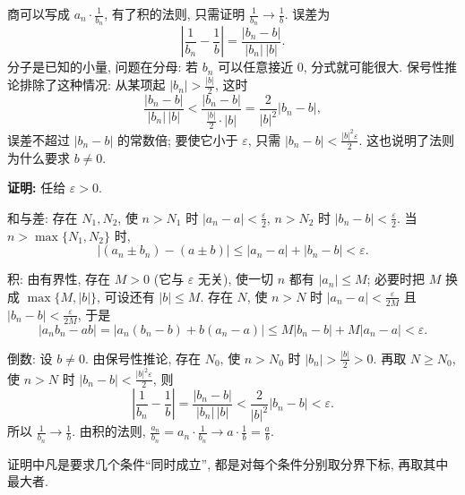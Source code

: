 \documentclass[UTF8,openany]{ctexbook}
\theoremstyle{chinesetextbook}
\newenvironment{cnproof}{\par\indent\textbf{证明:} \ignorespaces}{\par}
\begin{document}
商可以写成 $\displaystyle a_n\cdot\frac1{b_n}$, 有了积的法则, 只需证明 $\displaystyle\frac1{b_n}\to\frac1b$. 误差为
\[
\left|\frac1{b_n}-\frac1b\right|=\frac{|b_n-b|}{|b_n|\,|b|}.
\]
分子是已知的小量, 问题在分母: 若 $b_n$ 可以任意接近 $0$, 分式就可能很大. 保号性推论排除了这种情况: 从某项起 $\displaystyle|b_n|>\frac{|b|}2$, 这时
\[
\frac{|b_n-b|}{|b_n|\,|b|}<\frac{|b_n-b|}{\frac{|b|}2\cdot|b|}=\frac2{|b|^2}|b_n-b|,
\]
误差不超过 $|b_n-b|$ 的常数倍; 要使它小于 $\varepsilon$, 只需 $\displaystyle|b_n-b|<\frac{|b|^2\varepsilon}2$. 这也说明了法则为什么要求 $b\ne0$.
\begin{cnproof}
任给 $\varepsilon>0$.

和与差: 存在 $N_1,N_2$, 使 $n>N_1$ 时 $\displaystyle|a_n-a|<\frac\varepsilon2$, $n>N_2$ 时 $\displaystyle|b_n-b|<\frac\varepsilon2$. 当 $n>\max\{N_1,N_2\}$ 时,
\[
|(a_n\pm b_n)-(a\pm b)|\le|a_n-a|+|b_n-b|<\varepsilon.
\]

积: 由有界性, 存在 $M>0$ (它与 $\varepsilon$ 无关), 使一切 $n$ 都有 $|a_n|\le M$; 必要时把 $M$ 换成 $\max\{M,|b|\}$, 可设还有 $|b|\le M$. 存在 $N$, 使 $n>N$ 时 $\displaystyle|a_n-a|<\frac\varepsilon{2M}$ 且 $\displaystyle|b_n-b|<\frac\varepsilon{2M}$, 于是
\[
|a_nb_n-ab|=|a_n(b_n-b)+b(a_n-a)|\le M|b_n-b|+M|a_n-a|<\varepsilon.
\]

倒数: 设 $b\ne0$. 由保号性推论, 存在 $N_0$, 使 $n>N_0$ 时 $\displaystyle|b_n|>\frac{|b|}2>0$. 再取 $N\ge N_0$, 使 $n>N$ 时 $\displaystyle|b_n-b|<\frac{|b|^2\varepsilon}2$, 则
\[
\left|\frac1{b_n}-\frac1b\right|=\frac{|b_n-b|}{|b_n|\,|b|}<\frac2{|b|^2}|b_n-b|<\varepsilon.
\]
所以 $\displaystyle\frac1{b_n}\to\frac1b$. 由积的法则, $\displaystyle\frac{a_n}{b_n}=a_n\cdot\frac1{b_n}\to a\cdot\frac1b=\frac ab$.
\end{cnproof}
证明中凡是要求几个条件“同时成立”, 都是对每个条件分别取分界下标, 再取其中最大者.
\end{document}
